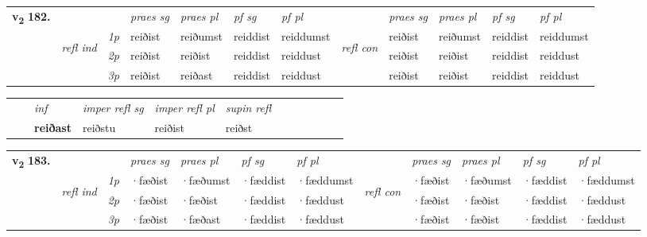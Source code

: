 \begin{tabular}{llllllllllll} \toprule
\multirow{4}{*}{{{\textbf{v{\textsubscript{2}}} \Large{\textbf{182.}}}}}  & &   &  \textit{praes sg}  & \textit{praes pl}  &\textit{pf sg} & \textit{pf pl} &  &  \textit{praes sg}  & \textit{praes pl}  & \textit{pf sg} & \textit{pf pl } \\*
	\cmidrule{4-7} \cmidrule{9-12}
 &\multirow{3}{*}{\begin{turn}{90}\textit{refl ind}\end{turn}} & {\textit{1p}} & reiðist & reiðumst    & reiddist & reiddumst & \multirow{3}{*}{\begin{turn}{90}\textit{refl con}\end{turn}}  &reiðist & reiðumst & reiddist & reiddumst\\*
 &&  {\textit{2p}} &  reiðist  & reiðist   & reiddist & reiddust & &reiðist & reiðist & reiddist & reiddust \\*
& &  {\textit{3p}} & reiðist & reiðast   & reiddist & reiddust & & reiðist & reiðist& reiddist & reiddust  \\*
\cmidrule{4-7} \cmidrule{9-12}
\end{tabular}


\begin{tabular}{llllllllllll}
 & & \textit{inf}   & \textit{imper refl sg} & \textit{imper refl pl}   & \textit{supin refl}      \\*
  & & \textbf{reiðast}    & reiðstu & reiðist   & reiðst  \\*
\cmidrule{1-12}
\end{tabular}



\begin{tabular}{llllllllllll} \toprule
\multirow{4}{*}{{{\textbf{v{\textsubscript{2}}} \Large{\textbf{183.}}}}}  & &   &  \textit{praes sg}  & \textit{praes pl}  &\textit{pf sg} & \textit{pf pl} &  &  \textit{praes sg}  & \textit{praes pl}  & \textit{pf sg} & \textit{pf pl } \\*
	\cmidrule{4-7} \cmidrule{9-12}
 &\multirow{3}{*}{\begin{turn}{90}\textit{refl ind}\end{turn}} & {\textit{1p}} & ·fæðist & ·fæðumst    & ·fæddist & ·fæddumst & \multirow{3}{*}{\begin{turn}{90}\textit{refl con}\end{turn}}  &·fæðist & ·fæðumst & ·fæddist & ·fæddumst\\*
 &&  {\textit{2p}} &  ·fæðist  & ·fæðist   & ·fæddist & ·fæddust & &·fæðist & ·fæðist & ·fæddist & ·fæddust \\*
& &  {\textit{3p}} & ·fæðist & ·fæðast   & ·fæddist & ·fæddust & & ·fæðist & ·fæðist& ·fæddist & ·fæddust  \\*
\cmidrule{4-7} \cmidrule{9-12}
\end{tabular}


